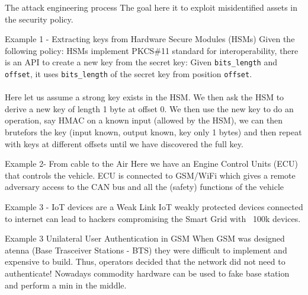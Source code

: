 \begin{parag}{The attack engineering process}
    The goal here it to exploit misidentified assets in the security policy.
	\begin{subparag}{Example 1 - Extracting keys from Hardware Secure Modules (HSMs)}
		Given the following policy: HSMs implement PKCS\#11 standard for interoperability, there is an API to create  a new key from the secret key: Given \texttt{bits\_length} and \texttt{offset}, it uses \texttt{bits\_length} of the secret key from position \texttt{offset}.\\
		$ $\\
		Here let us assume a strong key exists in the HSM. We then ask the HSM to derive a new key of length 1 byte at offset 0. We then use the new key to do an operation, say HMAC on a known input (allowed by the HSM), we can then brutefors the key (input known, output known, key only 1 bytes) and then repeat with keys at different offsets until we have discovered the full key.
	\end{subparag}

	\begin{subparag}{Example 2- From cable to the Air}
	    Here we have an Engine Control Units (ECU) that controls the vehicle. ECU is connected to GSM/WiFi which gives a remote adversary access to the CAN bus and all the (safety) functions of the vehicle
	\end{subparag}

	\begin{subparag}{Example 3 - IoT devices are a Weak Link}
	    IoT weakly protected devices connected to internet can lead to hackers compromising the Smart  Grid with ~100k devices.
	\end{subparag}

	\begin{subparag}{Example 3 Unilateral User Authentication in GSM}
	    When GSM was designed atenna (Base Trasceiver Stations - BTS) they were difficult to implement and expensive to build. Thus, operators decided that the network did not need to authenticate! Nowadays commodity hardware can be used to fake base station and perform a min in the middle.
	\end{subparag}


\end{parag}
